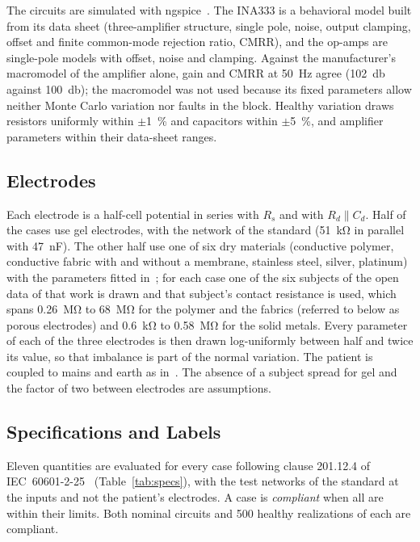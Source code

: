 The circuits are simulated with ngspice~\cite{ngspice}. The INA333 is a behavioral model built
from its data sheet (three-amplifier structure, single pole, noise, output clamping, offset and
finite common-mode rejection ratio, CMRR), and the op-amps are single-pole models with offset,
noise and clamping. Against the manufacturer's macromodel of the amplifier alone, gain and CMRR
at \SI{50}{\hertz} agree (\SI{102}{\decibel} against \SI{100}{\decibel}); the macromodel was not
used because its fixed parameters allow neither Monte Carlo variation nor faults in the block.
Healthy variation draws resistors uniformly within $\pm$\SI{1}{\percent} and capacitors within
$\pm$\SI{5}{\percent}, and amplifier parameters within their data-sheet ranges.

\subsection{Electrodes}
\label{sec:electrodes}

Each electrode is a half-cell potential in series with $R_s$ and with $R_d \parallel C_d$. Half
of the cases use gel electrodes, with the network of the standard (\SI{51}{\kilo\ohm} in parallel
with \SI{47}{\nano\farad}). The other half use one of six dry materials (conductive polymer,
conductive fabric with and without a membrane, stainless steel, silver, platinum) with the
parameters fitted in~\cite{joutsen2024}; for each case one of the six subjects of the open data
of that work is drawn and that subject's contact resistance is used, which spans
\SI{0.26}{\mega\ohm} to \SI{68}{\mega\ohm} for the polymer and the fabrics (referred to below as
porous electrodes) and \SI{0.6}{\kilo\ohm} to \SI{0.58}{\mega\ohm} for the solid metals. Every
parameter of each of the three electrodes is then drawn log-uniformly between half and twice its
value, so that imbalance is part of the normal variation. The patient is coupled to mains and
earth as in~\cite{winter1983}. The absence of a subject spread for gel and the factor of two
between electrodes are assumptions.

\subsection{Specifications and Labels}
\label{sec:specs}

Eleven quantities are evaluated for every case following clause 201.12.4 of
IEC~60601-2-25~\cite{iec60601225} (Table~\ref{tab:specs}), with the test networks of the standard
at the inputs and not the patient's electrodes. A case is \emph{compliant} when all are within
their limits. Both nominal circuits and 500 healthy realizations of each are compliant.

